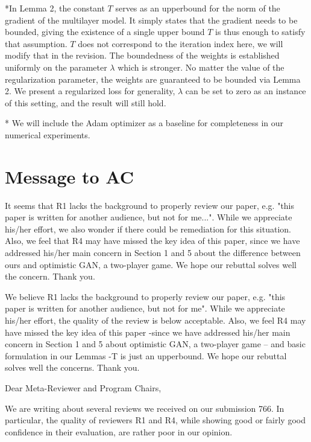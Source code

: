 \documentclass{article}
\begin{document}
*In Lemma 2, the constant $T$ serves as an upperbound for the norm of the gradient of the multilayer model. It simply states that the gradient needs to be bounded, giving the existence of a single upper bound $T$ is thus enough to satisfy that assumption. $T$ does not correspond to the iteration index here, we will modify that in the revision.
The boundedness of the weights is established uniformly on the parameter $\lambda$ which is stronger. No matter the value of the regularization parameter, the weights are guaranteed to be bounded via Lemma 2. We present a regularized loss for generality, $\lambda$ can be set to zero as an instance of this setting, and the result will still hold.

* We will include the Adam optimizer as a baseline for completeness in our numerical experiments.




\newpage

\section{Message to AC}

{\color{red}  
It seems that R1 lacks the background to properly review our paper, e.g. "this paper is written for another audience, but not for me...". While we appreciate his/her effort, we also wonder if there could be remediation for this situation. Also, we feel that R4 may have missed the key idea of this paper, since we have addressed his/her main concern in Section 1 and 5 about the difference between ours and optimistic GAN, a two-player game. We hope our rebuttal solves well the concern.
Thank you.

}

\medskip

{\color{red}  
We believe R1 lacks the background to properly review our paper, e.g. "this paper is written for another audience, but not for me". 
While we appreciate his/her effort, the quality of the review is below acceptable. 
Also, we feel R4 may have missed the key idea of this paper -since we have addressed his/her main concern in Section 1 and 5 about optimistic GAN, a two-player game -- and basic formulation in our Lemmas -T is just an upperbound.
We hope our rebuttal solves well the concerns.
Thank you.
}


\medskip

\medskip

Dear Meta-Reviewer and Program Chairs,

We are writing about several reviews we received on our submission 766.
In particular, the quality of reviewers R1 and R4, while showing good or fairly good confidence in their evaluation, are rather poor in our opinion.
\end{document}
